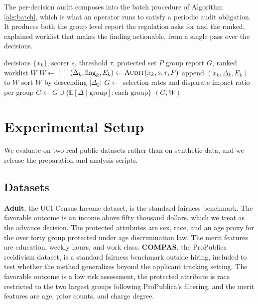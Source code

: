 \documentclass[conference]{IEEEtran}
\begin{document}
The per-decision audit composes into the batch procedure of Algorithm \ref{alg:batch},
which is what an operator runs to satisfy a periodic audit obligation. It produces both
the group level report the regulation asks for and the ranked, explained worklist that
makes the finding actionable, from a single pass over the decisions.

\begin{algorithm}[t]
\caption{AIBF batch audit and report}
\label{alg:batch}
\begin{algorithmic}[1]
\Require decisions $\{x_k\}$, scorer $s$, threshold $\tau$, protected set $P$
\Ensure group report $G$, ranked worklist $W$
\State $W \gets [\,]$
  \State $(\Delta_k, \mathrm{flag}_k, E_k) \gets \textsc{Audit}(x_k, s, \tau, P)$
   \State append $(x_k, \Delta_k, E_k)$ to $W$ \EndIf
\EndFor
\State sort $W$ by descending $|\Delta_k|$
\State $G \gets$ selection rates and disparate impact ratio per group
\State $G \gets G \cup \{\mathbb{E}[\Delta\mid \text{group}] : \text{each group}\}$
\State \Return $(G, W)$
\end{algorithmic}
\end{algorithm}

\section{Experimental Setup}
\label{sec:setup}
We evaluate on two real public datasets rather than on synthetic data, and we release
the preparation and analysis scripts.

\subsection{Datasets}
\textbf{Adult}, the UCI Census Income dataset, is the standard fairness benchmark. The
favorable outcome is an income above fifty thousand dollars, which we treat as the
advance decision. The protected attributes are sex, race, and an age proxy for the
over forty group protected under age discrimination law. The merit features are
education, weekly hours, and work class. \textbf{COMPAS}, the ProPublica recidivism
dataset, is a standard fairness benchmark outside hiring, included to test whether the
method generalizes beyond the applicant tracking setting. The favorable outcome is a
low risk assessment, the protected attribute is race restricted to the two largest
groups following ProPublica's filtering, and the merit features are age, prior counts,
and charge degree.
\end{document}
